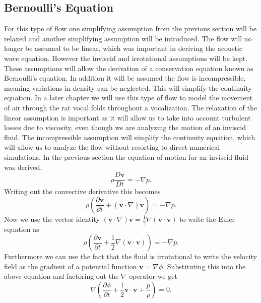 \documentclass[12pt, letter]{report}
\begin{document}
\subsection{Bernoulli's Equation}
For this type of flow one simplifying assumption from the previous section will be relaxed and another simplifying assumption will be introduced. The flow will no longer be assumed to be linear, which was important in deriving the acoustic wave equation. However the inviscid and irrotational assumptions will be kept. These assumptions will allow the derivation of a conservation equation known as Bernoulli's equation. In addition it will be assumed the flow is incompressible, meaning variations in density can be neglected. This will simplify the continuity equation. In a later chapter we will use this type of flow to model the movement of air through the rat vocal folds throughout a vocalization. The relaxation of the linear assumption is important as it will allow us to take into account turbulent losses due to viscosity, even though we are analyzing the motion of an inviscid fluid. The incompressible assumption will simplify the continuity equation, which will allow us to analyze the flow without resorting to direct numerical simulations. In the previous section the equation of motion for an inviscid fluid was derived.
\begin{equation}
\rho \frac{D \textbf{v}}{D t} = -\nabla p.
\end{equation}
Writing out the convective derivative this becomes
\begin{equation}
\rho \left( \frac{\partial  \textbf{v}}{\partial t} +  (\textbf{v} \cdot \nabla)  \textbf{v} \right) = -\nabla p.
\end{equation}
Now we use the vector identity $(\textbf{v} \cdot \nabla)  \textbf{v}=\frac{1}{2} \nabla ( \textbf{v} \cdot \textbf{v} )$ to write the Euler equation as
\begin{equation}
\rho \left( \frac{\partial  \textbf{v}}{\partial t} +  \frac{1}{2} \nabla ( \textbf{v} \cdot \textbf{v} ) \right) = -\nabla p.
\end{equation}
Furthermore we can use the fact that the fluid is irrotational to write the velocity field as the gradient of a potential function $ \textbf{v} = \nabla \phi$. Substituting this into the above equation and factoring out the $\nabla$ operator we get
\begin{equation}
\nabla \left( \frac{\partial  \phi}{\partial t} +  \frac{1}{2}  \textbf{v} \cdot \textbf{v} + \frac{p}{\rho} \right) = 0.
\end{equation}
\end{document}
